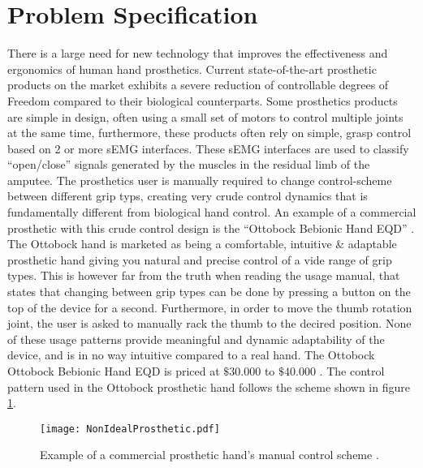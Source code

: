 \documentclass[../main.tex]{subfiles}
\begin{document}
\section{Problem Specification}

There is a large need for new technology that improves the effectiveness and ergonomics of human hand prosthetics.
Current state-of-the-art prosthetic products on the market exhibits a severe reduction of controllable degrees of Freedom compared to their biological counterparts.
Some prosthetics products are simple in design, often using a small set of motors to control multiple joints at the same time, furthermore, these products often rely on simple, grasp control based on 2 or more \gls{sEMG} interfaces.
These \gls{sEMG} interfaces are used to classify ``open/close'' signals generated by the muscles in the residual limb of the amputee.
The prosthetics user is manually required to change control-scheme between different grip typs, creating very crude control dynamics that is fundamentally different from biological hand control.
An example of a commercial prosthetic with this crude control design is the ``Ottobock Bebionic Hand EQD'' \cite{ottobock}.
The Ottobock hand is marketed as being a comfortable, intuitive \& adaptable prosthetic hand giving you natural and precise control of a vide range of grip types.
This is however far from the truth when reading the usage manual, that states that changing between grip types can be done by pressing a button on the top of the device for a second.
Furthermore, in order to move the thumb rotation joint, the user is asked to manually rack the thumb to the decired position.
None of these usage patterns provide meaningful and dynamic adaptability of the device, and is in no way intuitive compared to a real hand.
The Ottobock Ottobock Bebionic Hand EQD is priced at $\$30.000$ to $\$40.000$ \cite{ottobock-prices}.
The control pattern used in the Ottobock prosthetic hand follows the scheme shown in figure \ref{fig:nonidealprosthetic}.

\begin{figure}[H]
\begin{center}
\texttt{[image: NonIdealProsthetic.pdf]}
\caption{Example of a commercial prosthetic hand's manual control scheme \cite{ottobock}.}
\label{fig:nonidealprosthetic}
\end{center}
\end{figure}

\end{document}
